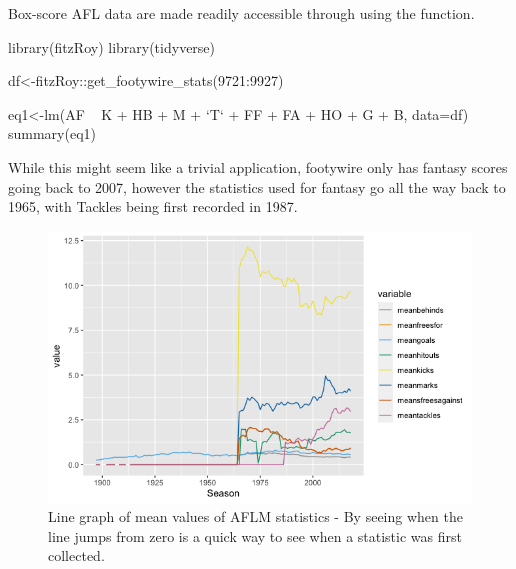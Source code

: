 Box-score AFL data are made readily accessible through  using the  function.

\begin{example}

library(fitzRoy)
library(tidyverse)

df<-fitzRoy::get_footywire_stats(9721:9927)

eq1<-lm(AF ~ K + HB + M + `T` + FF + FA + HO + G + B, data=df)
summary(eq1)
\end{example}

While this might seem like a trivial application, footywire only has fantasy scores going back to 2007, however the statistics used for fantasy go all the way back to 1965, with Tackles being first recorded in 1987.


\begin{figure}
	\centerline{\includegraphics[scale=0.6]{Rplot01.png}}
	\caption{Line graph of mean values of AFLM statistics - By seeing when the line jumps from zero is a quick way to see when a statistic was first collected.}
\end{figure}



